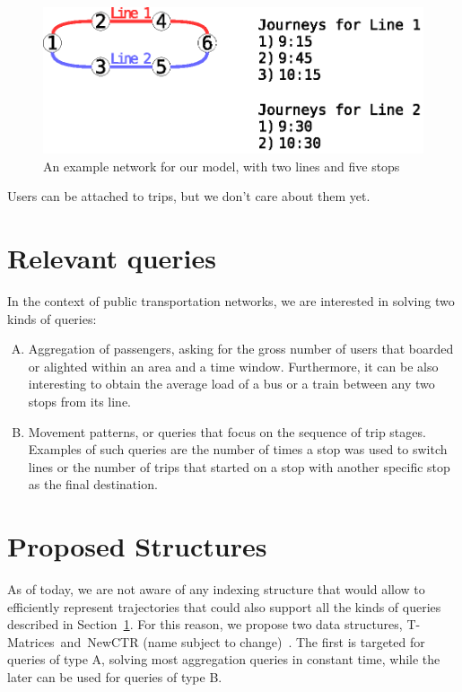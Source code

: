 \documentclass[runningheads]{llncs}
\newcommand{\acumm}{T-Matrices} %
\newcommand{\ctr}{NewCTR (name subject to change)\ }
\begin{document}
\begin{figure}
\includegraphics[width=\textwidth]{example_network.eps}
\caption{An example network for our model, with two lines and five stops}
\label{fig:example_network}
\end{figure}

Users can be attached to trips, but we don't care about them yet.

\section{Relevant queries}
\label{seq:rq}
In the context of public transportation networks, we are interested in solving two kinds of queries:

\begin{enumerate}[A)]
    \item Aggregation of passengers, asking for the gross number of users that boarded or alighted within an area and a time window. Furthermore, it can be also interesting to obtain the average load of a bus or a train between any two stops from its line.
    \item Movement patterns, or queries that focus on the sequence of trip stages. Examples of such queries are the number of times a stop was used to switch lines or the number of trips that started on a stop with another specific stop as the final destination.
\end{enumerate}

\section{Proposed Structures}
As of today, we are not aware of any indexing structure that would allow to efficiently represent trajectories that could also support all the kinds of queries described in Section~\ref{seq:rq}. For this reason, we propose two data structures, \acumm~and~\ctr. The first is targeted for queries of type A, solving most aggregation queries in constant time, while the later can be used for queries of type B.
\end{document}
